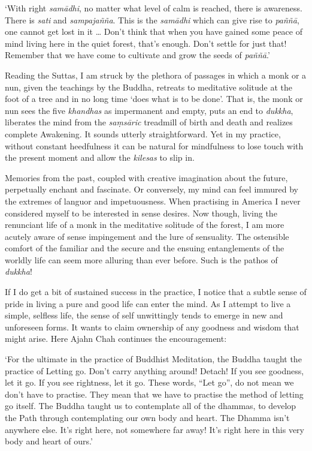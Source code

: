 `With right \emph{samādhi}, no matter what level of calm is reached, 
there is awareness. There is \emph{sati} and \emph{sampajañña}. This is
the \emph{samādhi} which can give rise to \emph{paññā}, one cannot get
lost in it \ldots{} Don't think that when you have gained some peace of
mind living here in the quiet forest, that's enough. Don't settle for
just that! Remember that we have come to cultivate and grow the seeds of
\emph{paññā}.'

Reading the Suttas, I am struck by the plethora of passages in which a
monk or a nun, given the teachings by the Buddha, retreats to meditative
solitude at the foot of a tree and in no long time `does what is to be
done'. That is, the monk or nun sees the five \emph{khandhas} as
impermanent and empty, puts an end to \emph{dukkha}, liberates the mind
from the \emph{saṃsāric} treadmill of birth and death and realizes
complete Awakening. It sounds utterly straightforward. Yet in my
practice, without constant heedfulness it can be natural for mindfulness
to lose touch with the present moment and allow the \emph{kilesas} to
slip in.

Memories from the past, coupled with creative imagination about
the future, perpetually enchant and fascinate. Or conversely, my mind
can feel immured by the extremes of languor and impetuousness. When
practising in America I never considered myself to be interested in
sense desires. Now though, living the renunciant life of a monk in the
meditative solitude of the forest, I am more acutely aware of sense
impingement and the lure of sensuality. The ostensible comfort of the
familiar and the secure and the ensuing entanglements of the worldly
life can seem more alluring than ever before. Such is the pathos of
\emph{dukkha}! 

If I do get a bit of sustained success in the practice, I notice that a
subtle sense of pride in living a pure and good life can enter the mind. 
As I attempt to live a simple, selfless life, the sense of self
unwittingly tends to emerge in new and unforeseen forms. It wants to
claim ownership of any goodness and wisdom that might arise. Here Ajahn
Chah continues the encouragement: 

`For the ultimate in the practice of Buddhist Meditation, the Buddha
taught the practice of Letting go. Don't carry anything around! Detach! 
If you see goodness, let it go. If you see rightness, let it go. These
words, ``Let go'', do not mean we don't have to practise. They mean that
we have to practise the method of letting go itself. The Buddha taught
us to contemplate all of the dhammas, to develop the Path through
contemplating our own body and heart. The Dhamma isn't anywhere else. 
It's right here, not somewhere far away! It's right here in this very
body and heart of ours.'

